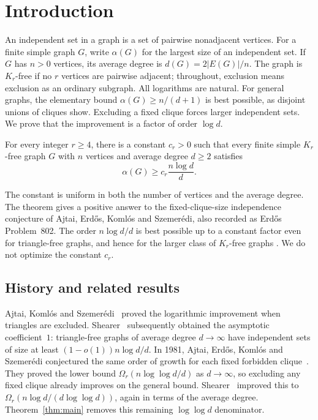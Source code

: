 \section{Introduction}
\label{sec:introduction}

An independent set in a graph is a set of pairwise nonadjacent vertices.
For a finite simple graph $G$, write $\alpha(G)$ for the largest size of
an independent set. If $G$ has $n>0$ vertices, its average degree is
$d(G)=2|E(G)|/n$. The graph is $K_r$-free if no $r$ vertices are pairwise
adjacent; throughout, exclusion means exclusion as an ordinary subgraph.
All logarithms are natural. For general graphs, the elementary bound
$\alpha(G)\ge n/(d+1)$ is best possible, as disjoint unions of cliques
show. Excluding a fixed clique forces larger independent sets. We prove
that the improvement is a factor of order $\log d$.

\begin{theorem}\label{thm:main}
For every integer $r\ge4$, there is a constant $c_r>0$ such that every
finite simple $K_r$-free graph $G$ with $n$ vertices and average degree $d\ge2$
satisfies
\[
 \alpha(G)\ge c_r\frac{n\log d}{d}.
\]
\end{theorem}

The constant is uniform in both the number of vertices and the average
degree. The theorem gives a positive answer to the fixed-clique-size
independence conjecture of Ajtai, Erd\H{o}s, Koml\'os and Szemer\'edi,
also recorded as Erd\H{o}s Problem~802. The order $n\log d/d$ is best
possible up to a constant factor even for triangle-free graphs, and
hence for the larger class of $K_r$-free graphs
\cite[pp.~314--315]{AEKS1981}. We do not optimize the constant $c_r$.

\subsection{History and related results}

Ajtai, Koml\'os and Szemer\'edi~\cite{AKS1980} proved the logarithmic
improvement when triangles are excluded.
Shearer~\cite{Shearer1983} subsequently obtained the asymptotic
coefficient~$1$: triangle-free graphs of average degree $d\to\infty$
have independent sets of size at least $(1-o(1))n\log d/d$.
In 1981, Ajtai, Erd\H os, Koml\'os and Szemer\'edi conjectured the same
order of growth for each fixed forbidden clique~\cite[p.~314, Equation~(3)]{AEKS1981}.
They proved the lower bound $\Omega_r(n\log\log d/d)$ as $d\to\infty$,
so excluding any fixed clique already improves on the general bound.
Shearer~\cite[Corollary~2]{Shearer1995} improved this to
$\Omega_r(n\log d/(d\log\log d))$, again in terms of the average
degree. Theorem~\ref{thm:main} removes this remaining $\log\log d$
denominator.

